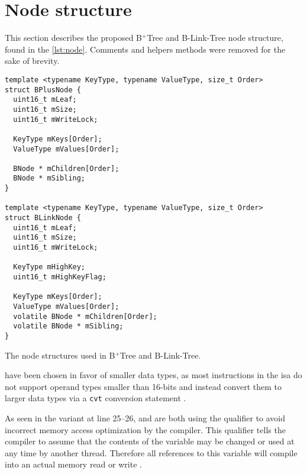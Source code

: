 \section{Node structure}

This section describes the proposed B$^+$Tree and B-Link-Tree node structure, found in the \cref{lst:node}. Comments and helpers methods were removed for the sake of brevity.

\begin{listing}
  \begin{verbatim}
template <typename KeyType, typename ValueType, size_t Order>
struct BPlusNode {
  uint16_t mLeaf;
  uint16_t mSize;
  uint16_t mWriteLock;

  KeyType mKeys[Order];
  ValueType mValues[Order];

  BNode * mChildren[Order]; 
  BNode * mSibling;
}

template <typename KeyType, typename ValueType, size_t Order>
struct BLinkNode {
  uint16_t mLeaf;
  uint16_t mSize;
  uint16_t mWriteLock;

  KeyType mHighKey;
  uint16_t mHighKeyFlag;

  KeyType mKeys[Order];
  ValueType mValues[Order];
  volatile BNode * mChildren[Order]; 
  volatile BNode * mSibling;
}
    \end{verbatim}
  \caption[B$^+$Tree and B-Link-Tree node structures]{The node structures used in B$^+$Tree and B-Link-Tree.}
  \label{lst:node}
\end{listing}

 have been chosen in favor of smaller data types, as most instructions in the \acrshort{isa} do not support operand types smaller than 16-bits and instead convert them to larger data types via a \texttt{cvt} conversion statement \cite{ptxisa}.

As seen in the  variant at line 25--26,  and  are both using the  qualifier to avoid incorrect memory access optimization by the compiler. This qualifier tells the compiler to assume that the contents of the variable may be changed or used at any time by another thread. Therefore all references to this variable will compile into an actual memory read or write \cite{cudaprog}.